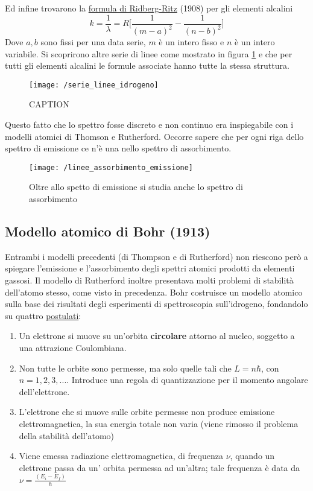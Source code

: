 Ed infine trovarono la \underline{formula di Ridberg-Ritz} (1908) per gli elementi alcalini
\begin{equation}
k = \frac{1}{\lambda} = R \biggl[ \frac{1}{(m-a)^2} - \frac{1}{(n-b)^2}  \biggr]
\end{equation}
Dove $a, b$ sono fissi per una data serie, $m$ è un intero fisso e $n$ è un intero variabile.
Si scoprirono altre serie di linee come mostrato in figura \ref{serie_linee} e che per tutti gli elementi alcalini le formule associate hanno tutte la stessa struttura.
\begin{figure}[h]
\centering
\texttt{[image: /serie\_linee\_idrogeno]}
\caption{CAPTION}
\label{serie_linee}
\end{figure}
Questo fatto che lo spettro fosse discreto e non continuo era inspiegabile con i modelli atomici di Thomson e Rutherford. 
Occorre sapere che per ogni riga dello spettro di emissione ce n'è una nello spettro di assorbimento.
\begin{figure}[h]
\centering
\texttt{[image: /linee\_assorbimento\_emissione]}
\caption{Oltre allo spetto di emissione si studia anche lo spettro di assorbimento}
\end{figure}



\subsection{Modello atomico di Bohr (1913)}
Entrambi i modelli precedenti (di Thompson e di Rutherford) non riescono però a spiegare l'emissione e l'assorbimento degli spettri atomici prodotti da elementi gassosi.
Il modello di Rutherford inoltre presentava molti problemi di stabilità dell'atomo stesso, come visto in precedenza.
Bohr costruisce un modello atomico sulla base dei risultati degli esperimenti di spettroscopia sull'idrogeno, fondandolo su quattro \underline{postulati}:
\begin{enumerate}
\item Un elettrone si muove su un'orbita \textbf{circolare} attorno al nucleo, soggetto a una attrazione Coulombiana.
\item Non tutte le orbite sono permesse, ma solo quelle tali che $L=n\hbar$, con $n=1, 2, 3, ... $. Introduce una regola di quantizzazione per il momento angolare dell'elettrone.
\item L'elettrone che si muove sulle orbite permesse non produce emissione elettromagnetica, la sua energia totale non varia (viene rimosso il problema della stabilità dell'atomo)
\item Viene emessa radiazione elettromagnetica, di frequenza $\nu$, quando un elettrone passa da un' orbita permessa ad un'altra; tale frequenza è data da $ \nu = \frac{(E_i - E_f)}{h}$
\end{enumerate}
%
